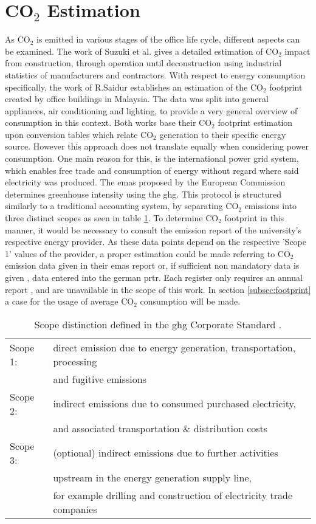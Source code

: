 \section{\texorpdfstring{CO$_2$ Estimation}{CO2 Estimation}}\label{sec:co2works}
As CO$_2$ is emitted in various stages of the office life cycle, different aspects can be examined. The work of Suzuki et al. \cite{suzuki} gives a detailed estimation of CO$_2$ impact from construction, through operation until deconstruction using industrial statistics of manufacturers and contractors.
With respect to energy consumption specifically, the work of R.Saidur \cite{saidur} establishes an estimation of the CO$_2$ footprint created by office buildings in Malaysia. The data was split into general appliances, air conditioning and lighting, to provide a very general overview of consumption in this context. 
Both works base their CO$_2$ footprint estimation upon conversion tables which relate CO$_2$ generation to their specific energy source. However this approach does not translate equally when considering power consumption. One main reason for this, is the international power grid system, which enables free trade and consumption of energy without regard where said electricity was produced. The \acrfull{emas} proposed by the European Commission determines greenhouse intensity using the \acrfull{ghg}. This protocol is structured similarly to a traditional accounting system, by separating CO$_2$ emissions into three distinct scopes as seen in table \ref{tab:scopes}. To determine CO$_2$ footprint in this manner, it would be necessary to consult the emission report of the university's respective energy provider. As these data points depend on the respective 'Scope 1' values of the provider, a proper estimation could be made referring to CO$_2$ emission data given in their \acrfull{emas} report or, if sufficient non mandatory data is given \cite{report}, data entered into the german \acrfull{prtr}. Each register only requires an annual report \cite{prtr_law}, and are unavailable in the scope of this work. In section \ref{subsec:footprint} a case for the usage of average CO$_2$ consumption will be made.

\begin{table}[h]
	\centering
	\begin{tabular}{|ll|}
		\hline
		Scope 1: & direct emission due to energy generation, transportation, processing \\
		& and fugitive emissions
		\\ \hline
		Scope 2: & indirect emissions due to consumed purchased electricity,\\
		& and associated transportation \& distribution costs
		\\ \hline
		Scope 3: & (optional) indirect emissions due to further activities \\
		& upstream in the energy generation supply line, \\
		&for example drilling and construction of electricity trade companies 
		\\ \hline
	\end{tabular}
	\caption{Scope distinction defined in the \acrfull{ghg} Corporate Standard \cite{ghg}.}
	\label{tab:scopes}
\end{table}
